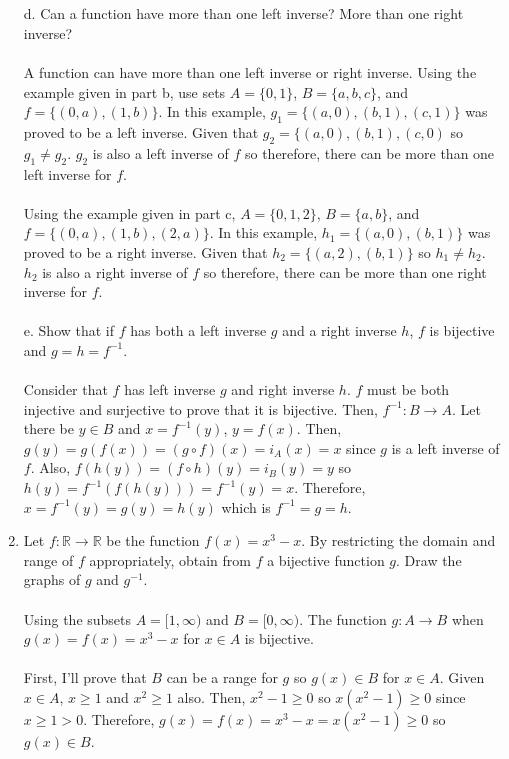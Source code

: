 \documentclass[]{article}
\begin{document}
\begin{enumerate}
    \\\\d. Can a function have more than one left inverse? More than one right inverse?
    \\\\ A function can have more than one left inverse or right inverse.
    \newline Using the example given in part b, use sets $A = \{0,1\}$, $B = \{a,b,c\}$, and $f=\{(0,a),(1,b)\}$. In this example, $g_1=\{(a,0),(b,1),(c,1)\}$ was proved to be a left inverse. Given that $g_2=\{(a,0),(b,1),(c,0)$ so $g_1 \neq g_2$. $g_2$ is also a left inverse of $f$ so therefore, there can be more than one left inverse for $f$.
    \\\\ Using the example given in part c, $A = \{0,1,2\}$, $B = \{a,b\}$, and $f = \{(0,a),(1,b),(2,a)\}$. In this example, $h_1=\{(a,0),(b,1)\}$ was proved to be a right inverse. Given that $h_2 = \{(a,2),(b,1)\}$ so $h_1 \neq h_2$. $h_2$ is also a right inverse of $f$ so therefore, there can be more than one right inverse for $f$.
    \\\\e. Show that if $f$ has both a left inverse $g$ and a right inverse $h$, $f$ is bijective and $g=h=f^{-1}$.
    \\\\ Consider that $f$ has left inverse $g$ and right inverse $h$. $f$ must be both injective and surjective to prove that it is bijective. Then, $f^{-1}:B \rightarrow A$. Let there be $y \in B$ and $x = f^{-1}(y)$, $y=f(x)$. Then, $g(y) = g(f(x)) = (g \circ f)(x) = i_A(x) = x$ since $g$ is a left inverse of $f$. Also, $f(h(y))=(f \circ h)(y)=i_B(y)=y$ so $h(y)=f^{-1}(f(h(y)))=f^{-1}(y)=x$. Therefore, $x=f^{-1}(y)=g(y)=h(y)$ which is $f^{-1}=g=h$.
    \item Let $f: \mathbb{R} \rightarrow \mathbb{R}$ be the function $f(x)=x^3-x$. By restricting the domain and range of $f$ appropriately, obtain from $f$ a bijective function $g$. Draw the graphs of $g$ and $g^{-1}$.
    \\\\ Using the subsets $A = [1,\infty)$ and $B=[0,\infty)$. The function $g: A \rightarrow B$ when $g(x)=f(x)=x^3-x$ for $x \in A$ is bijective. \\\\ First, I'll prove that $B$ can be a range for $g$ so $g(x) \in B$ for $x \in A$. Given $x \in A$, $x \geq 1$ and $x^2 \geq 1$ also. Then, $x^2-1 \geq 0$ so $x(x^2-1) \geq 0$ since $x \geq 1 > 0$. Therefore, $g(x)=f(x)=x^3-x=x(x^2-1) \geq 0$ so $g(x) \in B$.

\end{enumerate}
\end{document}
